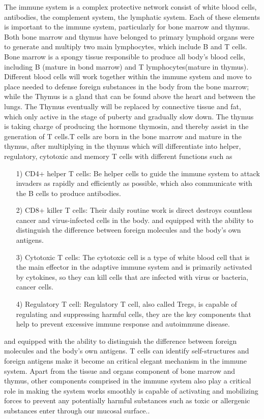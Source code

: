 \documentclass[12pt]{article}
\begin{document}
The immune system is a complex protective network consist of white blood cells, antibodies, the complement system, the lymphatic system. Each of these elements is important to the immune system, particularly for bone marrow and thymus. Both bone marrow and thymus have belonged to primary lymphoid organs were to generate and multiply two main lymphocytes, which include B and T cells.
Bone marrow is a spongy tissue responsible to produce all body's blood cells, including B (mature in bond marrow) and T lymphocytes(mature in thymus). Different blood cells will work together within the immune system and move to place needed to defense foreign substances in the body from the bone marrow; while the Thymus is a gland that can be found above the heart and between the lungs. The Thymus eventually will be replaced by connective tissue and fat, which only active in the stage of puberty and gradually slow down. The thymus is taking charge of producing the hormone thymosin, and thereby assist in the generation of T cells.T cells are born in the bone marrow and mature in the thymus, after multiplying in the thymus which will differentiate into helper, regulatory,  cytotoxic and memory T cells with different functions such as 
\begin{itemize}
    \item [1)] 
    CD4+ helper T cells: Be helper cells to guide the immune system to attack invaders as rapidly and efficiently as possible, which also communicate with the B cells to produce antibodies.
    \item [2)]
    CD8+ killer T cells: Their daily routine work is direct destroys countless cancer and virus-infected cells in the body. and equipped with the ability to distinguish the difference between foreign molecules and the body's own antigens.
    \item [3)]
    Cytotoxic T cells:
    The cytotoxic cell is a type of white blood cell that is the main effector in the adaptive immune system and is primarily activated by cytokines, so they can kill cells that are infected with virus or bacteria, cancer cells.
    \item [4)]
    Regulatory T cell:
    Regulatory T cell, also called Tregs, is capable of regulating and suppressing harmful cells, they are the key components that help to prevent excessive immune response and autoimmune disease.
\end{itemize}
and equipped with the ability to distinguish the difference between foreign molecules and the body's own antigens. T cells can identify self-structures and foreign antigens make it become an critical elegant mechanism in the immune system. Apart from the tissue and organs component of bone marrow and thymus, other components comprised in the immune system also play a critical role in making the system works smoothly is capable of activating and mobilizing forces to prevent any potentially harmful substances such as toxic or allergenic substances enter through our mucosal surface..\medskip
\end{document}
